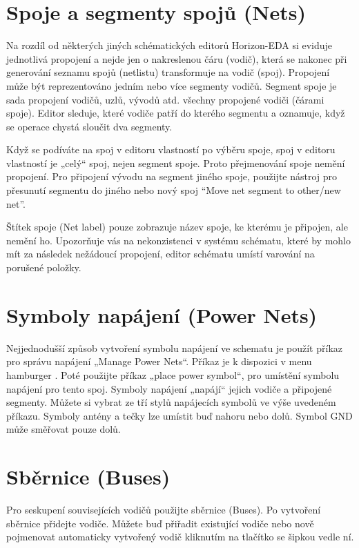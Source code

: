 \documentclass[letterpaper,10pt,czech]{sphinxmanual}
\let\sphinxpxdimen\pdfpxdimen\else\newdimen\sphinxpxdimen
\begin{document}
\section{Spoje a segmenty spojů (Nets)}
\label{\detokenize{imp-sch:spoje-a-segmenty-spoju-nets}}
Na rozdíl od některých jiných schématických editorů Horizon-EDA si eviduje jednotlivá propojení a nejde jen o nakreslenou čáru (vodič), která se nakonec při generování seznamu spojů (netlistu) transformuje na vodič (spoj). Propojení může být reprezentováno jedním nebo více segmenty vodičů. Segment spoje je sada propojení vodičů, uzlů, vývodů atd. všechny propojené vodiči (čárami spoje). Editor sleduje, které vodiče patří do kterého segmentu a oznamuje, když se operace chystá sloučit dva segmenty.

Když se podíváte na spoj v editoru vlastností po výběru spoje, spoj v editoru vlastností je „celý“ spoj, nejen segment spoje. Proto přejmenování spoje nemění propojení. Pro připojení vývodu na segment jiného spoje, použijte nástroj pro přesunutí segmentu do jiného nebo nový spoj “Move net segment to other/new net”.

Štítek spoje (Net label) pouze zobrazuje název spoje, ke kterému je připojen, ale nemění ho. Upozorňuje vás na nekonzistenci v systému schématu, které by mohlo mít za následek nežádoucí propojení, editor schématu umístí varování na porušené položky.


\section{Symboly napájení (Power Nets)}
\label{\detokenize{imp-sch:symboly-napajeni-power-nets}}
Nejjednodušší způsob vytvoření symbolu napájení ve schematu je použít příkaz pro správu napájení „Manage Power Nets“. Příkaz je k dispozici v menu hamburger \sphinxincludegraphics[height=10\sphinxpxdimen]{{hamburger}.png}. Poté použijte příkaz „place power symbol“, pro umístění symbolu napájení pro tento spoj. Symboly napájení „napájí“ jejich vodiče a připojené segmenty. Můžete si vybrat ze tří stylů napájecích symbolů ve výše uvedeném příkazu. Symboly antény a tečky
lze umístit buď nahoru nebo dolů. Symbol GND může směřovat pouze dolů.


\section{Sběrnice (Buses)}
\label{\detokenize{imp-sch:sbernice-buses}}
Pro seskupení souvisejících vodičů použijte sběrnice (Buses). Po vytvoření sběrnice přidejte vodiče. Můžete buď přiřadit existující vodiče nebo nově pojmenovat automaticky vytvořený vodič kliknutím na tlačítko se šipkou vedle ní.
\end{document}
